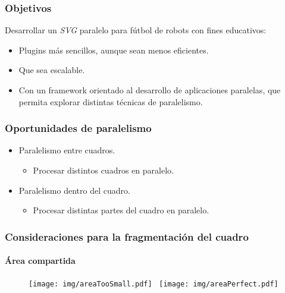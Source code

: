 \documentclass[11pt,a4paper,spanish]{beamer}
\begin{document}
\begin{frame}

\frametitle{Objetivos}

Desarrollar un \emph{SVG} paralelo para fútbol de robots con fines educativos:

\begin{itemize}

	\item Plugins más sencillos, aunque sean menos eficientes.

	\item Que sea escalable.

	\item Con un framework orientado al desarrollo de aplicaciones
		paralelas, que permita explorar distintas técnicas de
		paralelismo.

\end{itemize}

\end{frame}

\begin{frame}

\frametitle{Oportunidades de paralelismo}

\begin{itemize}

	\item Paralelismo entre cuadros.

\begin{itemize}

	\item Procesar distintos cuadros en paralelo.

\end{itemize}

	\item Paralelismo dentro del cuadro.

\begin{itemize}

	\item Procesar distintas partes del cuadro en paralelo.

\end{itemize}

\end{itemize}

\end{frame}

\begin{frame}

\frametitle{Consideraciones para la fragmentación del cuadro}

\framesubtitle{Área compartida}

\begin{figure}[h]

	\centering

	\texttt{[image: img/areaTooSmall.pdf]}~
	\texttt{[image: img/areaPerfect.pdf]}

\end{figure}

\end{frame}
\end{document}
